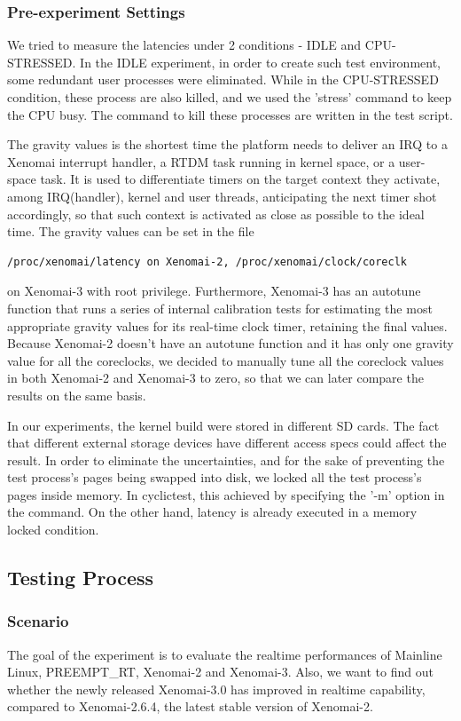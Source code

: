 \documentclass[10pt,a4paper]{article}
\begin{document}
\begin{multicols}{2}
\subsubsection{Pre-experiment Settings}
We tried to measure the latencies under 2 conditions - IDLE and CPU-STRESSED. In the IDLE experiment, in order to create such test environment, some redundant user processes were eliminated. While in the CPU-STRESSED condition, these process are also killed, and we used the 'stress' command to keep the CPU busy. The command to kill these processes are written in the test script.

  The gravity values is the shortest time the platform needs to deliver an IRQ to a Xenomai interrupt handler,  a RTDM task running in kernel space, or a user-space task. It is used to differentiate timers on the target context they activate, among IRQ(handler), kernel and user threads, anticipating the next timer shot accordingly, so that such context is activated as close as possible to the ideal time. The gravity values can be set in the file \begin{verbatim}/proc/xenomai/latency on Xenomai-2, /proc/xenomai/clock/coreclk
\end{verbatim} on Xenomai-3 with root privilege. Furthermore, Xenomai-3 has an autotune function that runs a series of internal calibration tests for estimating the most appropriate gravity values for its real-time clock timer, retaining the final values.
Because Xenomai-2 doesn't have an autotune function and it has only one gravity value for all the 
coreclocks, we decided to manually tune all the coreclock values in both Xenomai-2 and Xenomai-3 to zero, so that we can later compare the results on the same basis. 

In our experiments, the kernel build were stored in different SD cards. The fact that different external storage devices have different access specs could affect the result. In order to eliminate the uncertainties, and for the sake of preventing the test process's pages being swapped into disk, we locked all the test process's pages inside memory. In cyclictest, this achieved by specifying the '-m' option in the command. On the other hand, latency is already executed in a memory locked condition.

\subsection{Testing Process}

\subsubsection{Scenario}
The goal of the experiment is to evaluate the realtime performances of Mainline Linux, PREEMPT\_RT, 
Xenomai-2 and Xenomai-3. Also, we want to find out whether the newly released Xenomai-3.0 has improved in realtime capability, compared to Xenomai-2.6.4, the latest stable version of Xenomai-2.

\end{multicols}
\end{document}
